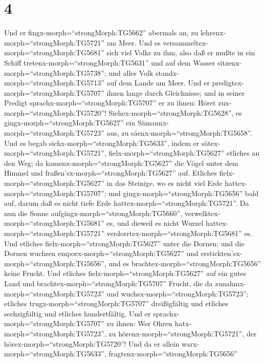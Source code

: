 \hypertarget{section-3}{%
\section{4}\label{section-3}}

 Und er fingx-morph=``strongMorph:TG5662'' abermals an, zu
lehrenx-morph=``strongMorph:TG5721'' am Meer. Und es
versammeltex-morph=``strongMorph:TG5681'' sich viel Volks zu ihm, also
daß er mußte in ein Schiff tretenx-morph=``strongMorph:TG5631'' und auf
dem Wasser sitzenx-morph=``strongMorph:TG5738''; und alles Volk
standx-morph=``strongMorph:TG5713'' auf dem Lande am Meer. 
Und er predigtex-morph=``strongMorph:TG5707'' ihnen lange durch
Gleichnisse; und in seiner Predigt sprachx-morph=``strongMorph:TG5707''
er zu ihnen:  Höret zux-morph=``strongMorph:TG5720''!
Siehex-morph=``strongMorph:TG5628'', es
gingx-morph=``strongMorph:TG5627'' ein
Sämannx-morph=``strongMorph:TG5723'' aus, zu
säenx-morph=``strongMorph:TG5658''.  Und es begab
sichx-morph=``strongMorph:TG5633'', indem er
sätex-morph=``strongMorph:TG5721'', fielx-morph=``strongMorph:TG5627''
etliches an den Weg; da kamenx-morph=``strongMorph:TG5627'' die Vögel
unter dem Himmel und fraßen'sx-morph=``strongMorph:TG5627'' auf.
 Etliches fielx-morph=``strongMorph:TG5627'' in das
Steinige, wo es nicht viel Erde hattex-morph=``strongMorph:TG5707''; und
gingx-morph=``strongMorph:TG5656'' bald auf, darum daß es nicht tiefe
Erde hattex-morph=``strongMorph:TG5721''.  Da nun die Sonne
aufgingx-morph=``strongMorph:TG5660'',
verwelktex-morph=``strongMorph:TG5681'' es, und dieweil es nicht Wurzel
hattex-morph=``strongMorph:TG5721''
verdorrtex-morph=``strongMorph:TG5681'' es.  Und etliches
fielx-morph=``strongMorph:TG5627'' unter die Dornen; und die Dornen
wuchsen emporx-morph=``strongMorph:TG5627'' und
erstickten'sx-morph=``strongMorph:TG5656'', und es
brachtex-morph=``strongMorph:TG5656'' keine Frucht.  Und
etliches fielx-morph=``strongMorph:TG5627'' auf ein gutes Land und
brachtex-morph=``strongMorph:TG5707'' Frucht, die da
zunahmx-morph=``strongMorph:TG5723'' und
wuchsx-morph=``strongMorph:TG5723''; etliches
trugx-morph=``strongMorph:TG5707'' dreißigfältig und etliches
sechzigfältig und etliches hundertfältig.  Und er
sprachx-morph=``strongMorph:TG5707'' zu ihnen: Wer Ohren
hatx-morph=``strongMorph:TG5723'', zu
hörenx-morph=``strongMorph:TG5721'', der
hörex-morph=``strongMorph:TG5720''!  Und da er allein
warx-morph=``strongMorph:TG5633'', fragtenx-morph=``strongMorph:TG5656''

